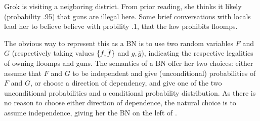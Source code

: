 \documentclass{article}
\theoremstyle{plain}
\theoremstyle{definition}
\theoremstyle{remark}
\numberwithin{equation}{section}
\begin{document}
\begin{example} \label{ex:guns-and-floomps}
Grok is visiting a neigboring district. From prior reading, she thinks it likely (probability
.95) that guns are illegal here. Some brief conversations with locals lead her to believe believe with
probility .1, that the law prohibits floomps.

The obvious way to represent this as a BN is to use two random variables
$F$ and $G$ (respectively taking values $\{f, \smash{\overline f}\}$ and $g, \overline g$), indicating the respective legalities of owning floomps and guns.
The semantics of a 
BN
offer her two choices: either assume that $F$ and $G$
to be independent and give (unconditional) probabilities of $F$ and $G$, or
choose a direction of dependency, and give one of the two unconditional
probabilities and a conditional probability distribution. 
As there is no reason to choose either direction of dependence, the natural choice is to
assume independence, giving her the 
BN on the left of .


\end{example}
\end{document}
